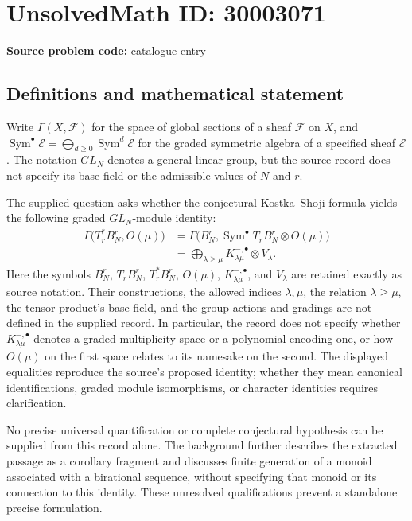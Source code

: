 \documentclass[11pt]{article}
\begin{document}
\section*{UnsolvedMath ID: 30003071}
\textbf{Source problem code:} catalogue entry
\subsection{Definitions and mathematical statement}
Write \(\Gamma(X,\mathcal F)\) for the space of global sections of a sheaf \(\mathcal F\) on \(X\), and \(\operatorname{Sym}^{\bullet}\mathcal E=\bigoplus_{d\geq 0}\operatorname{Sym}^{d}\mathcal E\) for the graded symmetric algebra of a specified sheaf \(\mathcal E\). The notation \(GL_N\) denotes a general linear group, but the source record does not specify its base field or the admissible values of \(N\) and \(r\).

The supplied question asks whether the conjectural Kostka--Shoji formula yields the following graded \(GL_N\)-module identity:
\[
\begin{aligned}
\Gamma\bigl(T_r^*B_N^r,O(\mu)\bigr)
&=\Gamma\bigl(B_N^r,\operatorname{Sym}^{\bullet}T_rB_N^r\otimes O(\mu)\bigr)\\
&=\bigoplus_{\lambda\geq\mu}K_{\lambda\mu}^{-,\bullet}\otimes V_\lambda.
\end{aligned}
\]
Here the symbols \(B_N^r\), \(T_rB_N^r\), \(T_r^*B_N^r\), \(O(\mu)\), \(K_{\lambda\mu}^{-,\bullet}\), and \(V_\lambda\) are retained exactly as source notation. Their constructions, the allowed indices \(\lambda,\mu\), the relation \(\lambda\geq\mu\), the tensor product's base field, and the group actions and gradings are not defined in the supplied record. In particular, the record does not specify whether \(K_{\lambda\mu}^{-,\bullet}\) denotes a graded multiplicity space or a polynomial encoding one, or how \(O(\mu)\) on the first space relates to its namesake on the second. The displayed equalities reproduce the source's proposed identity; whether they mean canonical identifications, graded module isomorphisms, or character identities requires clarification.

No precise universal quantification or complete conjectural hypothesis can be supplied from this record alone. The background further describes the extracted passage as a corollary fragment and discusses finite generation of a monoid associated with a birational sequence, without specifying that monoid or its connection to this identity. These unresolved qualifications prevent a standalone precise formulation.
\end{document}
